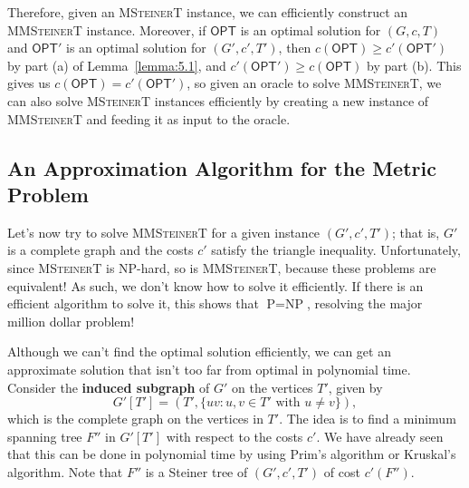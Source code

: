 Therefore, given an \textsc{MSteinerT} instance, we can efficiently construct 
an \textsc{MMSteinerT} instance. Moreover, if $\textsf{OPT}$ is an optimal solution for 
$(G, c, T)$ and $\textsf{OPT}'$ is an optimal solution for $(G', c', T')$, 
then $c(\textsf{OPT}) \geq c'(\textsf{OPT}')$ by part (a) of Lemma~\ref{lemma:5.1},
and $c'(\textsf{OPT}') \geq c(\textsf{OPT})$ by part (b). This gives us 
$c(\textsf{OPT}) = c'(\textsf{OPT}')$,
so given an oracle to solve \textsc{MMSteinerT}, we can also solve 
\textsc{MSteinerT} instances efficiently by creating a new instance 
of \textsc{MMSteinerT} and feeding it as input to the oracle.

\subsection{An Approximation Algorithm for the Metric Problem} \label{subsec:5.3}
Let's now try to solve \textsc{MMSteinerT} for a given instance $(G', c', T')$;
that is, $G'$ is a complete graph and the costs $c'$ satisfy the triangle 
inequality. Unfortunately, since \textsc{MSteinerT} is NP-hard, so is 
\textsc{MMSteinerT}, because these problems are equivalent! As such, we don't 
know how to solve it efficiently. If there is an efficient algorithm to solve it, this 
shows that $\text{P} = \text{NP}$, resolving the major million dollar problem!

Although we can't find the optimal solution efficiently, we can get an 
approximate solution that isn't too far from optimal in polynomial time. 
Consider the {\bf induced subgraph} of $G'$ on the vertices $T'$, given by 
\[ G'[T'] = (T', \{uv : u, v \in T' \text{ with } u\neq v\}), \] 
which is the complete graph on the vertices in $T'$. The idea is to find a 
minimum spanning tree $F''$ in $G'[T']$ with respect to the costs $c'$. 
We have already seen that this can be done in polynomial time by using 
Prim's algorithm or Kruskal's algorithm. Note that $F''$ is a Steiner 
tree of $(G', c', T')$ of cost $c'(F'')$. 

